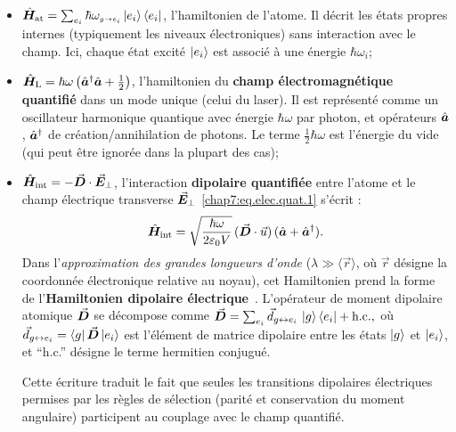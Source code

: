 \begin{itemize}[label = $\bullet$]
	\item \(\hat{\bm{H}}_{\mathrm{at}} = \sum_{e_i} \hbar \omega_{\scriptscriptstyle g \rightarrow e_i } \ket{e_i}\bra{e_i} \), l’hamiltonien de l’atome. Il décrit les états propres internes (typiquement les niveaux électroniques) sans interaction avec le champ. Ici, chaque état excité $\ket{e_i}$ est associé à une énergie $\hbar \omega_i$;
	\item \(\hat{\bm{H}}_{\mathrm{L}} = \hbar \omega \left(\hat{\bm{a}}^\dagger \hat{\bm{a}} + \frac{1}{2}\right)\), l’hamiltonien du {\bf champ électromagnétique quantifié} dans un mode unique (celui du laser). Il est représenté comme un oscillateur harmonique quantique avec énergie $ \hbar \omega $  par photon, et opérateurs \( \hat{\bm{a}} \) , \( \hat{\bm{a}}^\dagger \) de création/annihilation de photons. Le terme $\tfrac12 \hbar \omega$ est l’énergie du vide (qui peut être ignorée dans la plupart des cas);
	\item $\hat{\bm{H}}_{\mathrm{int}} = - \vec{{\bm{D}}} \cdot \vec{{\bm{E}}}_\perp$, l’interaction \textbf{dipolaire quantifiée} entre l’atome et le champ électrique transverse $\vec{{\bm{E}}}_\perp$ \eqref{chap7:eq.elec.quat.1} s’écrit :
		\begin{eqnarray}
			\hat{\bm{H}}_{\mathrm{int}} 
			= \sqrt{\frac{\hbar \omega}{2\varepsilon_0 V}} \, (\vec{{\bm{D}}} \cdot \vec{u}) \, (\hat{\bm{a}} + \hat{\bm{a}}^\dagger).
		\end{eqnarray}
		Dans l’\textit{approximation des grandes longueurs d’onde} ($\lambda \gg \langle \vec{r} \rangle$, où $\vec{r}$ désigne la coordonnée électronique relative au noyau), cet Hamiltonien prend la forme de l’\textbf{Hamiltonien dipolaire électrique}~\cite{CohenTannoudjiPhotonsAtomes, SteckRubidium87}.  L’opérateur de moment dipolaire atomique $\vec{{\bm{D}}}$ se décompose comme
		\(
		\vec{{\bm{D}}} 
		= \sum_{e_i} \vec{d}_{g \leftrightarrow e_i} \, \ket{g} \bra{e_i} + \text{h.c.},
		\)
		où $\vec{d}_{g \leftrightarrow e_i} = \bra{g} \vec{{\bm{D}}} \ket{e_i}$ est l’élément de matrice dipolaire entre les états $\ket{g}$ et $\ket{e_i}$, et ``h.c.'' désigne le terme hermitien conjugué.  
		
		\medskip
		
		Cette écriture traduit le fait que seules les transitions dipolaires électriques permises par les règles de sélection (parité et conservation du moment angulaire) participent au couplage avec le champ quantifié.
	
\end{itemize}

